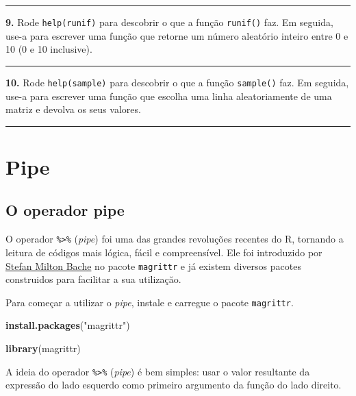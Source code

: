 \documentclass[]{book}
\newenvironment{Shaded}{\begin{snugshade}}{\end{snugshade}}
\newcommand{\KeywordTok}[1]{\textcolor[rgb]{0.13,0.29,0.53}{\textbf{#1}}}
\newcommand{\NormalTok}[1]{#1}
\newcommand{\StringTok}[1]{\textcolor[rgb]{0.31,0.60,0.02}{#1}}
\begin{document}
\begin{center}\rule{0.5\linewidth}{0.5pt}\end{center}

\textbf{9.} Rode \texttt{help(runif)} para descobrir o que a função \texttt{runif()} faz. Em seguida, use-a para escrever uma função que retorne um número aleatório inteiro entre 0 e 10 (0 e 10 inclusive).

\begin{center}\rule{0.5\linewidth}{0.5pt}\end{center}

\textbf{10.} Rode \texttt{help(sample)} para descobrir o que a função \texttt{sample()} faz. Em seguida, use-a para escrever uma função que escolha uma linha aleatoriamente de uma matriz e devolva os seus valores.

\begin{center}\rule{0.5\linewidth}{0.5pt}\end{center}

\hypertarget{pipe}{%
\chapter{Pipe}\label{pipe}}

\hypertarget{o-operador-pipe}{%
\section{O operador pipe}\label{o-operador-pipe}}

O operador \texttt{\%\textgreater{}\%} (\emph{pipe}) foi uma das grandes revoluções recentes do R, tornando a leitura de códigos mais lógica, fácil e compreensível. Ele foi introduzido por \href{https://github.com/smbache}{Stefan Milton Bache} no pacote \texttt{magrittr} e já existem diversos pacotes construidos para facilitar a sua utilizaçăo.

Para começar a utilizar o \emph{pipe}, instale e carregue o pacote \texttt{magrittr}.

\begin{Shaded}
\begin{Highlighting}[]
\KeywordTok{install.packages}\NormalTok{(}\StringTok{"magrittr"}\NormalTok{)}

\KeywordTok{library}\NormalTok{(magrittr)}
\end{Highlighting}
\end{Shaded}

A ideia do operador \texttt{\%\textgreater{}\%} (\emph{pipe}) é bem simples: usar o valor resultante da expressão do lado esquerdo como primeiro argumento da função do lado direito.
\end{document}
